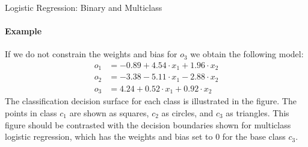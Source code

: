 \begin{frame}{Logistic Regression: Binary and Multiclass}
\framesubtitle{Example}
If we do not constrain the weights and bias for $o_3$ we obtain the
following model:
    \begin{align*}
        o_1 & = -0.89 + 4.54 \cdot x_1 + 1.96 \cdot x_2\\
        o_2 & = -3.38 -5.11 \cdot x_1 -2.88 \cdot x_2\\
        o_3 & = 4.24 + 0.52 \cdot x_1 + 0.92 \cdot x_2
    \end{align*}
The classification decision surface for each class is illustrated in
the figure.
The points in class $c_1$ are shown as squares, $c_2$ as circles, and
$c_3$ as triangles. 
This figure should be
contrasted with the decision boundaries shown for multiclass logistic
regression,
which 
has the weights and bias set to $0$ for the base class $c_3$.

\end{frame}
%
%
%
%
